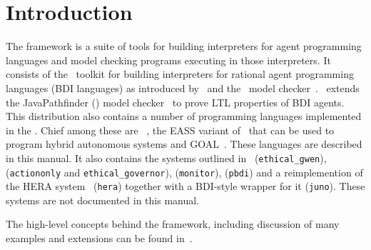 \chapter{Introduction}

\begin{sloppypar}
The \mcapl{} framework is a suite of tools for building interpreters
for agent programming languages and  model checking programs
executing in those interpreters.  It consists of the \ail\ toolkit for building interpreters for rational agent programming languages (BDI languages) as introduced by~\cite{rao:92a} and the \ajpf\ model checker~\cite{MCAPL_journal}.  \ajpf\ extends the JavaPathfinder (\jpf) model checker~\cite{VisserHBPL03} to prove LTL properties of BDI agents.  This distribution also contains a number of programming languages implemented in the \ail.  Chief among these are \gwendolen~\cite{dennis17gwen}, the EASS variant of \gwendolen\ that can be used to program hybrid autonomous systems and GOAL~\cite{GOAL01}.  These languages are described in this manual.  It also contains the systems outlined in~\cite{Dennis2015} (\texttt{ethical\_gwen}), \cite{dennis15:_towar_verif_ethic_robot_behav} (\texttt{actiononly} and \texttt{ethical\_governor}), \cite{ferrando18} (\texttt{monitor}), \cite{bremner19} (\texttt{pbdi}) and a reimplemention of the {\sc HERA} system~\cite{hera} (\texttt{hera}) together with a BDI-style wrapper for it (\texttt{juno}).  These systems are not documented in this manual.
\end{sloppypar}

The high-level concepts behind the \mcapl{} framework, including discussion of many examples and extensions can be found in~\cite{mcapl_book}.

